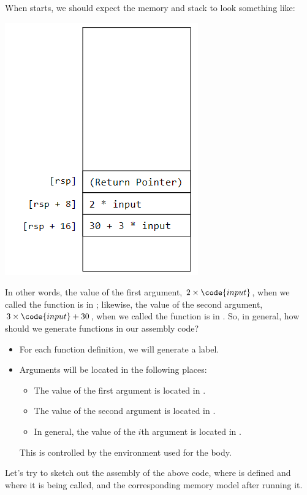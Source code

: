 \documentclass[letterpaper]{article}
\begin{document}
When  starts, we should expect the memory and stack to look something like:
\begin{center}
    \includegraphics[scale=0.6]{../assets/function_mem_layout_dec.png}
\end{center}
In other words, the value of the first argument, $2 \times \code{input}$, when we called the function is in \code{[rsp + 8]}; likewise, the value of the second argument, $3 \times \code{input} + 30$, when we called the function is in \code{[rsp + 16]}. So, in general, how should we generate functions in our assembly code? 
\begin{itemize}
    \item For each function definition, we will generate a label. 
    \item Arguments will be located in the following places: 
    \begin{itemize}
        \item The value of the first argument is located in \code{[rsp + 8]}. 
        \item The value of the second argument is located in \code{[rsp + 16]}.
        \item In general, the value of the $i$th argument is located in \code{[rsp + 8(i + 1)]}.
    \end{itemize}
    This is controlled by the environment used for the body. 
\end{itemize}

Let's try to sketch out the assembly of the above code, where  is defined and where it is being called, and the corresponding memory model after running it. 
\end{document}
